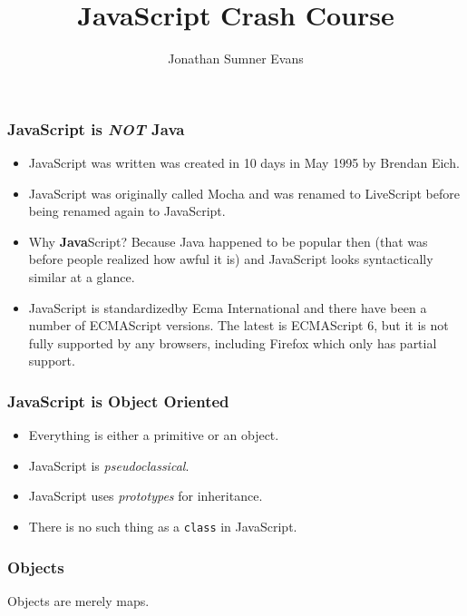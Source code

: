 \documentclass{lug}
\title{JavaScript Crash Course}
\author{Jonathan Sumner Evans}
\begin{document}
\begin{frame}
    \frametitle{JavaScript is \textbf{\textit{NOT}} Java \footnotemark[1]}

    \begin{itemize}[<+->]
        \item JavaScript was written was created in 10 days in May 1995 by Brendan Eich.
        \item JavaScript was originally called Mocha and was renamed to LiveScript before being
            renamed again to JavaScript.
        \item Why \textbf{Java}Script? Because Java happened to be popular then (that was before
            people realized how awful it is) and JavaScript looks syntactically similar at a glance.
        \item JavaScript is standardized\footnotemark[2] by Ecma International and there have been a
            number of ECMAScript versions. The latest is ECMAScript 6, but it is not fully supported
            by any browsers, including Firefox which only has partial support.
    \end{itemize}

\end{frame}

\begin{frame}
    \frametitle{JavaScript is Object Oriented}

    \begin{itemize}[<+->]
        \item Everything is either a primitive or an object.
        \item JavaScript is \textit{pseudoclassical}.
        \item JavaScript uses \textit{prototypes} for inheritance.
        \item There is no such thing as a \texttt{class} in JavaScript.\footnotemark[1]
    \end{itemize}

\end{frame}

\begin{frame}
    \frametitle{Objects}

    Objects are merely maps.
\end{frame}
\end{document}
